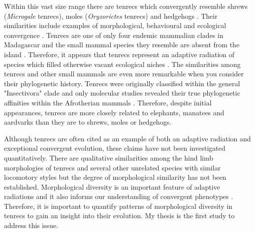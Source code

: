 	Within this vast size range there are tenrecs which convergently resemble shrews (\textit{Microgale} tenrecs), moles (\textit{Oryzorictes} tenrecs) and hedgehogs \citep[\textit{Echinops} and \textit{Setifer} tenrecs,][]{Eisenberg1969}. Their similarities include examples of morphological, behavioural and ecological convergence \citep{Soarimalala2011}. Tenrecs are one of only four endemic mammalian clades in Madagascar and the small mammal species they resemble are absent from the island \citep{Garbutt1999}. Therefore, it appears that tenrecs represent an adaptive radiation of species which filled otherwise vacant ecological niches \citep{Soarimalala2011}.
	The similarities among tenrecs and other small mammals are even more remarkable when you consider their phylogenetic history. Tenrecs were originally classified within the general "Insectivora" clade and only molecular studies revealed their true phylogenetic affinities within the Afrotherian mammals \citep{Stanhope1998}. Therefore, despite initial appearances, tenrecs are more closely related to elephants, manatees and aardvarks than they are to shrews, moles or hedgehogs. 
	

	Although tenrecs are often cited as an example of both an adaptive radiation and exceptional convergent evolution, these claims have not been investigated quantitatively. There are qualitative similarities among the hind limb morphologies of tenrecs and several other unrelated species with similar locomotory styles \citep{Salton2009} but the degree of morphological similarity has not been established. Morphological diversity is an important feature of adaptive radiations \citep{Losos2010a} and it also informs our understanding of convergent phenotypes \citep{Muschick2012}. Therefore, it is important to quantify patterns of morphological diversity in tenrecs to gain an insight into their evolution. My thesis is the first study to address this issue. 


